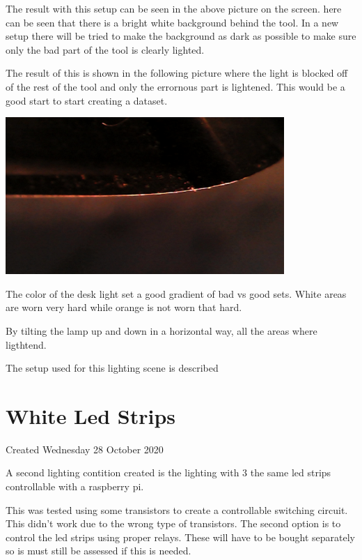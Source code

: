 \documentclass{article}
\begin{document}
The result with this setup can be seen in the above picture on the screen. here can be seen that there is a bright white background behind the tool. In a new setup there will be tried to make the background as dark as possible to make sure only the bad part of the tool is clearly lighted.



The result of this is shown in the following picture where the light is blocked off of the rest of the tool and only the errornous part is lightened. This would be a good start to start creating a dataset.



\includegraphics[width=4.166667in, keepaspectratio=true]{./ZimFiles_files/Camera_setup/Light/Desk_Lamp_Test/eerste-opstelling_donkere_achtergrond2.jpg}



The color of the desk light set a good gradient of bad vs good sets. White areas are worn very hard while orange is not worn that hard.



By tilting the lamp up and down in a horizontal way, all the areas where ligthtend. 



The setup used for this lighting scene is described 


		\section{White Led Strips}

Created Wednesday 28 October 2020



A second lighting contition created is the lighting with 3 the same led strips controllable with a raspberry pi. 

This was tested using some transistors to create a controllable switching circuit. This didn't work due to the wrong type of transistors. The second option is to control the led strips using proper relays. These will have to be bought separately so is must still be assessed if this is needed.
\end{document}
